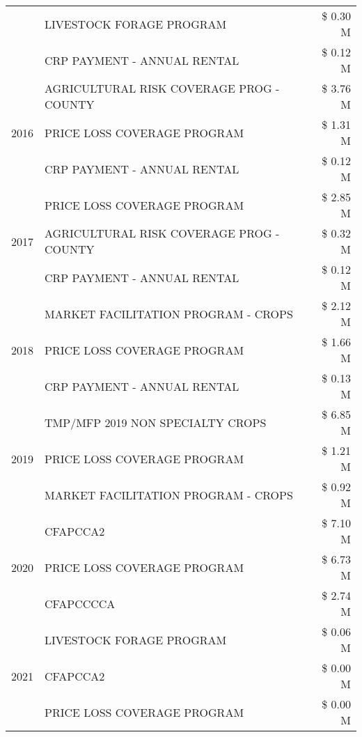 \begin{tabular}{llr}
 & LIVESTOCK FORAGE PROGRAM & \$ 0.30 M \\
 & CRP PAYMENT - ANNUAL RENTAL & \$ 0.12 M \\
\cline{1-3}
\multirow[t]{3}{*}{2016} & AGRICULTURAL RISK COVERAGE PROG - COUNTY & \$ 3.76 M \\
 & PRICE LOSS COVERAGE PROGRAM & \$ 1.31 M \\
 & CRP PAYMENT - ANNUAL RENTAL & \$ 0.12 M \\
\cline{1-3}
\multirow[t]{3}{*}{2017} & PRICE LOSS COVERAGE PROGRAM & \$ 2.85 M \\
 & AGRICULTURAL RISK COVERAGE PROG - COUNTY & \$ 0.32 M \\
 & CRP PAYMENT - ANNUAL RENTAL & \$ 0.12 M \\
\cline{1-3}
\multirow[t]{3}{*}{2018} & MARKET FACILITATION PROGRAM - CROPS & \$ 2.12 M \\
 & PRICE LOSS COVERAGE PROGRAM & \$ 1.66 M \\
 & CRP PAYMENT - ANNUAL RENTAL & \$ 0.13 M \\
\cline{1-3}
\multirow[t]{3}{*}{2019} & TMP/MFP 2019 NON SPECIALTY CROPS & \$ 6.85 M \\
 & PRICE LOSS COVERAGE PROGRAM & \$ 1.21 M \\
 & MARKET FACILITATION PROGRAM - CROPS & \$ 0.92 M \\
\cline{1-3}
\multirow[t]{3}{*}{2020} & CFAPCCA2 & \$ 7.10 M \\
 & PRICE LOSS COVERAGE PROGRAM & \$ 6.73 M \\
 & CFAPCCCCA & \$ 2.74 M \\
\cline{1-3}
\multirow[t]{3}{*}{2021} & LIVESTOCK FORAGE PROGRAM & \$ 0.06 M \\
 & CFAPCCA2 & \$ 0.00 M \\
 & PRICE LOSS COVERAGE PROGRAM & \$ 0.00 M \\
\cline{1-3}
\bottomrule
\end{tabular}
